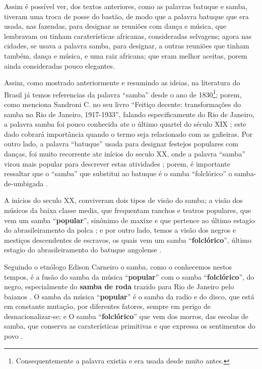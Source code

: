 Assim é possível ver, dos textos anteriores, como as palavras batuque e samba, 
tiveram uma troca de posse do bastão,
de modo que a palavra batuque que era usada, nas fazendas, 
para designar as reuniões com dança e música,
que lembravam ou tinham caraterísticas africanas, consideradas selvagens;
agora nas cidades, se usava a palavra samba, para designar,
a outras reuniões que tinham também, dança e música, 
e uma raiz africana; que eram melhor aceitas, porem ainda consideradas pouco elegantes. 





Assim, como mostrado anteriormente e resumindo as ideias, 
na literatura do Brasil já temos referencias da palavra ``samba'' desde o ano de 1830\footnote{
Consequentemente a palavra existia e era usada desde muito antes.}; 
porem, como menciona Sandroni C. no seu livro ``Feitiço decente: transformações do samba no Rio de Janeiro, 1917-1933'', 
falando especificamente do Rio de Janeiro, 
a palavra samba foi pouco conhecida ate o último quartel do século XIX \cite[pp. 86]{sandroni2001feitico};
este dado cobrará importância quando o termo seja relacionado com as gafieiras.
Por outro lado, a palavra  ``batuque'' usada para designar festejos populares com danças, 
foi muito recorrente ate inícios do seculo XX, 
onde a palavra ``samba'' virou mais popular para descrever estas atividades \cite[pp. 85]{sandroni2001feitico} \cite[pp. 47]{diniz2008almanaque}; porem,
é importante ressaltar que o ``samba'' que substitui ao batuque 
é o samba ``folclórico'' o samba-de-umbigada  \cite[pp. 96]{sandroni2001feitico}.

A inícios do seculo XX, 
conviveram dois tipos de visão do samba;
a visão dos músicos da baixa classe media, que frequentam ranchos e teatros populares, 
que vem um samba ``\textbf{popular}'', 
sinônimo de maxixe e que pertence ao último estagio 
do abrasileiramento da polca  \cite[pp. 139]{sandroni2001feitico}; e
por outro lado, temos a visão dos negros e mestiços descendentes de escravos,
os quais vem um samba ``\textbf{folclórico}'', 
último estagio do abrasileiramento do batuque angolense \cite[pp. 139]{sandroni2001feitico}.

Seguindo o etnólogo Edison Carneiro o samba, como o conhecemos nestos tempos,
é a fusão do samba da música ``\textbf{popular}'' com o samba  ``\textbf{folclórico}'', 
do negro, especialmente do \textbf{samba de roda} trazido para Rio de Janeiro pelo baianos \cite[pp. 21]{jornalsambaderoda1}.
O samba da música ``\textbf{popular}'' é o samba da radio e do disco, que está em constante mutação,
por diferentes fatores, sempre em perigo de desnacionalizar-se; e O samba   ``\textbf{folclórico}''
que vem dos morros, das escolas de samba, que conserva as caraterísticas primitivas e
que expressa os sentimentos do povo \cite[pp. 21]{jornalsambaderoda1}.


